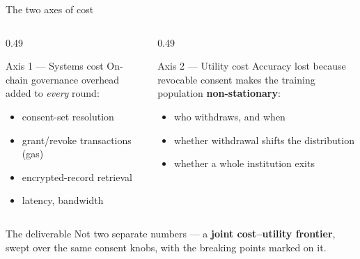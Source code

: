 \documentclass[aspectratio=169, 11pt]{beamer}
\newcommand{\done}{{\color{mTeal}\textbf{[EXECUTED]}}}
\newcommand{\planned}{{\color{mGray}\textbf{[PLANNED]}}}
\begin{document}
\begin{frame}{The two axes of cost}
\begin{columns}[T]
\begin{column}{0.49\textwidth}
\begin{block}{Axis 1 --- Systems cost \quad\planned}
On-chain governance overhead added to \emph{every} round:
\begin{itemize}\small
\item consent-set resolution
\item grant/revoke transactions (gas)
\item encrypted-record retrieval
\item latency, bandwidth
\end{itemize}
\end{block}
\end{column}
\begin{column}{0.49\textwidth}
\begin{block}{Axis 2 --- Utility cost \quad\done}
Accuracy lost because revocable consent makes the training population
\textbf{non-stationary}:
\begin{itemize}\small
\item who withdraws, and when
\item whether withdrawal shifts the distribution
\item whether a whole institution exits
\end{itemize}
\end{block}
\end{column}
\end{columns}
\vspace{0.6em}
\begin{alertblock}{The deliverable}
Not two separate numbers --- a \textbf{joint cost--utility frontier}, swept
over the same consent knobs, with the breaking points marked on it.
\end{alertblock}
\end{frame}
\end{document}
